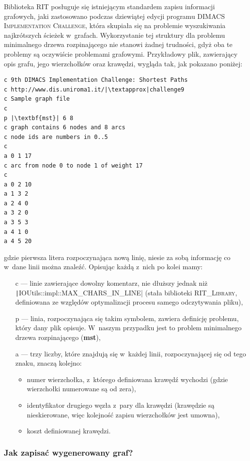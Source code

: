 Biblioteka \textsc{RIT} posługuje się istniejącym standardem zapisu informacji grafowych, jaki zastosowano podczas dziewiątej edycji programu \textsc{DIMACS Implementation Challenge}, która skupiała się na problemie wyszukiwania najkrótszych ścieżek w~grafach. Wykorzystanie tej struktury dla problemu minimalnego drzewa rozpinającego nie stanowi żadnej trudności, gdyż oba te problemy są oczywiście problemami grafowymi. Przykładowy plik, zawierający opis grafu, jego wierzchołków oraz krawędzi, wygląda tak, jak pokazano poniżej:

\begin{verbatim}
c 9th DIMACS Implementation Challenge: Shortest Paths
c http://www.dis.uniroma1.it/|\textapprox|challenge9
c Sample graph file
c
p |\textbf{mst}| 6 8
c graph contains 6 nodes and 8 arcs
c node ids are numbers in 0..5
c
a 0 1 17
c arc from node 0 to node 1 of weight 17
c
a 0 2 10
a 1 3 2
a 2 4 0
a 3 2 0
a 3 5 3
a 4 1 0
a 4 5 20
\end{verbatim}
gdzie pierwsza litera rozpoczynająca nową linię, niesie za sobą informację co w~dane linii można znaleźć. Opisując każdą z~nich po kolei mamy:

\begin{itemize}
	\item[c] --- linie zawierające dowolny komentarz, nie dłuższy jednak niż \texttt|IOUtils::impl::MAX_CHARS_IN_LINE| (stała biblioteki \textsc{RIT\_Library}, definiowana ze względów optymalizacji procesu samego odczytywania pliku),
	\item[p] --- linia, rozpoczynająca się takim symbolem, zawiera definicję problemu, który dany plik opisuje. W~naszym przypadku jest to problem minimalnego drzewa rozpinającego (\textbf{mst}),
	\item[a] --- trzy liczby, które znajdują się w~każdej linii, rozpoczynającej się od tego znaku, znaczą kolejno:
	\begin{itemize}
		\item numer wierzchołka, z~którego definiowana krawędź wychodzi (gdzie wierzchołki numerowane są od zera),
		\item identyfikator drugiego węzła z~pary dla krawędzi (krawędzie są nieskierowane, więc kolejność zapisu wierzchołków jest umowna),
		\item koszt definiowanej krawędzi.
	\end{itemize}
\end{itemize}

\subsubsection{Jak zapisać wygenerowany graf?}

